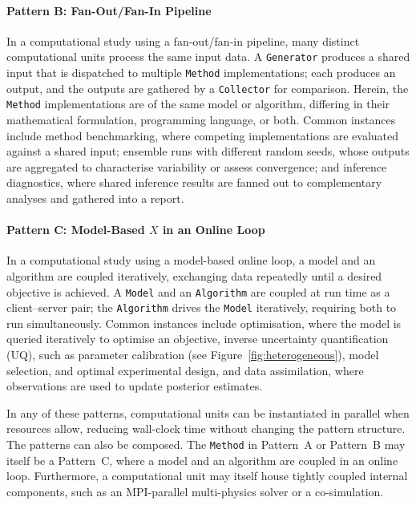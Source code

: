 \documentclass{eceasst}
\begin{document}
\paragraph{Pattern B: Fan-Out/Fan-In Pipeline}
In a computational study using a fan-out/fan-in pipeline, many distinct
computational units process the same input data.
A \texttt{Generator} produces a shared input that is dispatched to multiple
\texttt{Method} implementations; each produces an output, and the outputs
are gathered by a \texttt{Collector} for comparison.
Herein, the \texttt{Method} implementations are of the same model or algorithm,
differing in their mathematical formulation, programming language, or both.
Common instances include method benchmarking, where competing implementations
are evaluated against a shared input; ensemble runs with different random seeds,
whose outputs are aggregated to characterise variability or assess convergence;
and inference diagnostics, where shared inference results are fanned out to
complementary analyses and gathered into a report.

\paragraph{Pattern C: Model-Based $X$ in an Online Loop}
In a computational study using a model-based online loop, a model and an
algorithm are coupled iteratively, exchanging data repeatedly until a desired
objective is achieved.
A \texttt{Model} and an \texttt{Algorithm} are coupled at run time as a
client--server pair; the \texttt{Algorithm} drives the \texttt{Model}
iteratively, requiring both to run simultaneously.
Common instances include optimisation, where the model is queried iteratively
to optimise an objective, inverse uncertainty quantification (UQ), such as
parameter calibration (see Figure~\ref{fig:heterogeneous}), model selection,
and optimal experimental design, and data assimilation, where observations are
used to update posterior estimates.

\FloatBarrier

\medskip
In any of these patterns, computational units can be instantiated in parallel
when resources allow, reducing wall-clock time without changing the pattern
structure. The patterns can also be composed. The \texttt{Method} in Pattern~A
or Pattern~B may itself be a Pattern~C, where a model and an algorithm are
coupled in an online loop. Furthermore, a computational unit may itself house
tightly coupled internal components, such as an MPI-parallel multi-physics
solver or a co-simulation.
\end{document}
